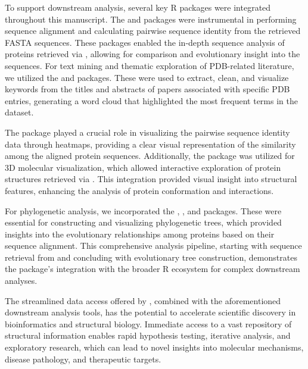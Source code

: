 To support downstream analysis, several key R packages were integrated throughout this manuscript. The  \citep{Biostrings2024} and  \citep{bodenhofer2015msa} packages were instrumental in performing sequence alignment and calculating pairwise sequence identity from the retrieved FASTA sequences. These packages enabled the in-depth sequence analysis of proteins retrieved via , allowing for comparison and evolutionary insight into the sequences. For text mining and thematic exploration of PDB-related literature, we utilized the  \citep{Feinerer2024tm} and  \citep{Fellows2018} packages. These were used to extract, clean, and visualize keywords from the titles and abstracts of papers associated with specific PDB entries, generating a word cloud that highlighted the most frequent terms in the dataset.

The  \citep{Gregory2024} package played a crucial role in visualizing the pairwise sequence identity data through heatmaps, providing a clear visual representation of the similarity among the aligned protein sequences. Additionally, the  \citep{Su2021} package was utilized for 3D molecular visualization, which allowed interactive exploration of protein structures retrieved via . This integration provided visual insight into structural features, enhancing the analysis of protein conformation and interactions.

For phylogenetic analysis, we incorporated the  \citep{Paradis2024},  \citep{Schliep2023}, and  \citep{yu2017ggtree} packages. These were essential for constructing and visualizing phylogenetic trees, which provided insights into the evolutionary relationships among proteins based on their sequence alignment. This comprehensive analysis pipeline, starting with sequence retrieval from  and concluding with evolutionary tree construction, demonstrates the package's integration with the broader R ecosystem for complex downstream analyses.

The streamlined data access offered by , combined with the aforementioned downstream analysis tools, has the potential to accelerate scientific discovery in bioinformatics and structural biology. Immediate access to a vast repository of structural information enables rapid hypothesis testing, iterative analysis, and exploratory research, which can lead to novel insights into molecular mechanisms, disease pathology, and therapeutic targets.

